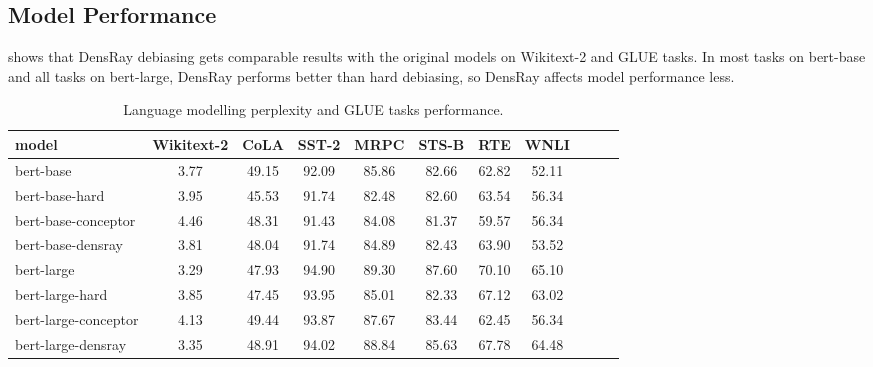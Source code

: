 \subsection{Model Performance}
 shows that DensRay debiasing gets comparable results with
the original models on Wikitext-2 and GLUE tasks. In most tasks on bert-base and all tasks on bert-large, DensRay performs better than hard debiasing, so DensRay affects model performance less.
\begin{table}[h]
\centering
\footnotesize
\begin{tabular}{lcccccccccc}
\hline
model & Wikitext-2&CoLA &SST-2&MRPC&STS-B&RTE&WNLI\\
\hline
bert-base &3.77&49.15&92.09&85.86&82.66&62.82&52.11\\
bert-base-hard &3.95&45.53&91.74&82.48&82.60&63.54&56.34\\
bert-base-conceptor &4.46&48.31&91.43&84.08&81.37&59.57&56.34\\
bert-base-densray &3.81&48.04&91.74&84.89&82.43&63.90&53.52\\
\hline
bert-large &3.29& 47.93&94.90&89.30&87.60&70.10&65.10\\
bert-large-hard &3.85& 47.45&93.95&85.01&82.33&67.12&63.02\\
bert-large-conceptor &4.13&49.44&93.87&87.67&83.44&62.45&56.34\\
bert-large-densray &3.35& 48.91&94.02&88.84&85.63&67.78&64.48\\
\hline
\end{tabular}
\caption{
Language modelling perplexity and GLUE tasks
performance. }
\end{table}

